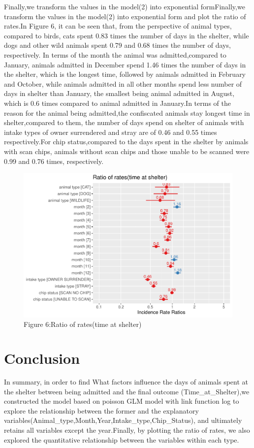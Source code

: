 \documentclass[
]{article}
\begin{document}
Finally,we transform the values in the model(2) into exponential
formFinally,we transform the values in the model(2) into exponential
form and plot the ratio of rates.In Figure 6, it can be seen that, from
the perspective of animal types, compared to birds, cats spent 0.83
times the number of days in the shelter, while dogs and other wild
animals spent 0.79 and 0.68 times the number of days, respectively. In
terms of the month the animal was admitted,compared to January, animals
admitted in December spend 1.46 times the number of days in the shelter,
which is the longest time, followed by animals admitted in February and
October, while animals admitted in all other months spend less number of
days in shelter than January, the smallest being animal admitted in
August, which is 0.6 times compared to animal admitted in January.In
terms of the reason for the animal being admitted,the confiscated
animals stay longest time in shelter,compared to them, the number of
days spend on shelter of animals with intake types of owner surrendered
and stray are of 0.46 and 0.55 times respectively.For chip
status,compared to the days spent in the shelter by animals with scan
chips, animals without scan chips and those unable to be scanned were
0.99 and 0.76 times, respectively.

\begin{figure}[H]

{\centering \includegraphics[width=0.68\linewidth]{Group_16_Project_files/figure-latex/unnamed-chunk-9-1} 

}

\caption{\label{fig:box} Figure 6:Ratio of rates(time at shelter)}\label{fig:unnamed-chunk-9}
\end{figure}

\hypertarget{conclusion}{%
\section{Conclusion}\label{conclusion}}

In summary, in order to find What factors influence the days of animals
spent at the shelter between being admitted and the final outcome
(Time\_at\_Shelter),we constructed the model based on poisson GLM model
with link function log to explore the relationship between the former
and the explanatory
variables(Animal\_type,Month,Year,Intake\_type,Chip\_Status), and
ultimately retains all variables except the year.Finally, by plotting
the ratio of rates, we also explored the quantitative relationship
between the variables within each type.
\end{document}
